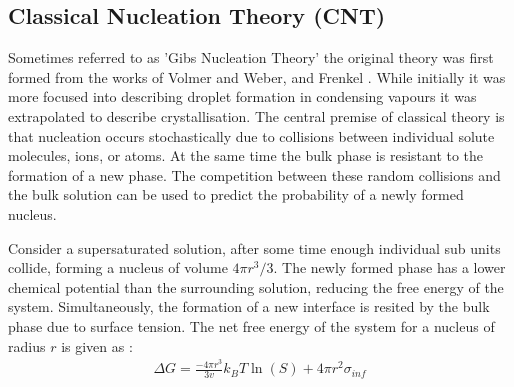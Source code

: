 \subsection{Classical Nucleation Theory (CNT)}
Sometimes referred to as 'Gibs Nucleation Theory' the original theory 
was first formed from the works of Volmer and Weber, and Frenkel 
\cite{Frenkel1939, Volmer1926}. While initially it was more focused 
into describing droplet formation in condensing vapours it was 
extrapolated to describe crystallisation. The central premise of 
classical theory is that nucleation occurs stochastically due to 
collisions between individual solute molecules, ions, or atoms. At the 
same time the bulk phase is resistant to the formation of a new phase. 
The competition between these random collisions and the bulk solution 
can be used to predict the probability of a newly formed nucleus.
 
Consider a supersaturated solution, after some time enough individual
sub units collide, forming a nucleus of volume $4\pi r^3/3$. The newly 
formed phase has a lower chemical potential than the surrounding solution, 
reducing the free energy of the system. Simultaneously, the formation of 
a new interface is resited by the bulk phase due to surface tension. 
The net free energy of the system for a nucleus of radius $r$ is given 
as \cite{Karthika2016}:
\begin{align}
	\Delta G = \frac{-4\pi r^3}{3v}k_BT\ln(S) + 4\pi r^{2}\sigma_{inf}
	\label{eq:CNT} 
\end{align}


